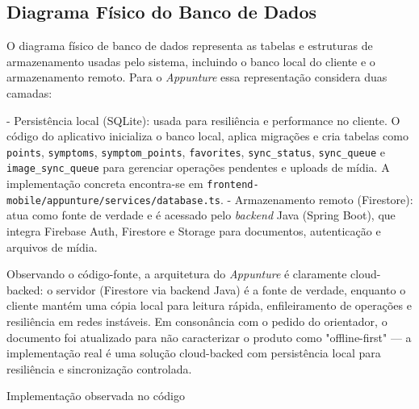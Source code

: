 \subsection{Diagrama Físico do Banco de Dados}

O diagrama físico de banco de dados representa as tabelas e estruturas de armazenamento usadas pelo sistema, incluindo o banco local do cliente e o armazenamento remoto. Para o \textit{Appunture} essa representação considera duas camadas:
 
- Persistência local (SQLite): usada para resiliência e performance no cliente. O código do aplicativo inicializa o banco local, aplica migrações e cria tabelas como \texttt{points}, \texttt{symptoms}, \texttt{symptom\_points}, \texttt{favorites}, \texttt{sync\_status}, \texttt{sync\_queue} e \texttt{image\_sync\_queue} para gerenciar operações pendentes e uploads de mídia. A implementação concreta encontra-se em \texttt{frontend-mobile/appunture/services/database.ts}.
- Armazenamento remoto (Firestore): atua como fonte de verdade e é acessado pelo \textit{backend} Java (Spring Boot), que integra Firebase Auth, Firestore e Storage para documentos, autenticação e arquivos de mídia.

Observando o código-fonte, a arquitetura do \textit{Appunture} é claramente cloud-backed: o servidor (Firestore via backend Java) é a fonte de verdade, enquanto o cliente mantém uma cópia local para leitura rápida, enfileiramento de operações e resiliência em redes instáveis. Em consonância com o pedido do orientador, o documento foi atualizado para não caracterizar o produto como "offline-first" — a implementação real é uma solução cloud-backed com persistência local para resiliência e sincronização controlada.

Implementação observada no código

